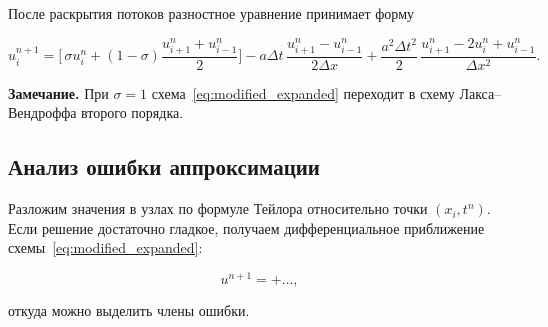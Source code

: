 \documentclass[12pt]{article}
\begin{document}
После раскрытия потоков разностное уравнение принимает форму

\begin{equation}
u_i^{n+1} = \biggl[\,\sigma u_i^n 
            + (1-\sigma)\frac{u_{i+1}^n + u_{i-1}^n}{2}\biggr]
            - a\Delta t\,\frac{u_{i+1}^n - u_{i-1}^n}{2\Delta x}
            + \frac{a^2\Delta t^2}{2}\,
              \frac{u_{i+1}^n - 2u_i^n + u_{i-1}^n}{\Delta x^2}.
\label{eq:modified_expanded}
\end{equation}

\textbf{Замечание.} При $\sigma=1$ схема~\eqref{eq:modified_expanded} переходит в схему Лакса–Вендроффа второго порядка.

\subsection{Анализ ошибки аппроксимации}
Разложим значения в узлах по формуле Тейлора относительно точки $(x_i,t^n)$. Если решение достаточно гладкое, получаем дифференциальное приближение схемы~\eqref{eq:modified_expanded}:

\begin{dmath}
u^{n + 1} =  + \ldots,
\end{dmath}

откуда можно выделить члены ошибки.

\end{document}
